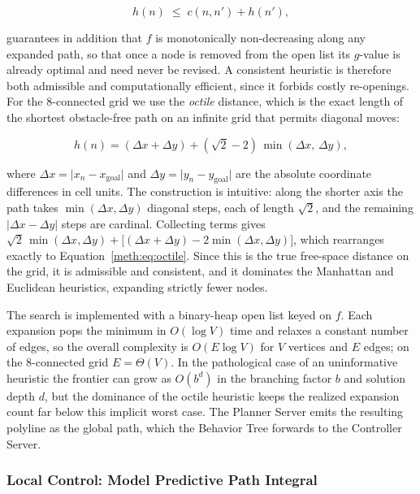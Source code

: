 \begin{equation}\label{meth:eq:consistency}
  h(n) \;\le\; c(n,n') + h(n'),
\end{equation}

guarantees in addition that $f$ is monotonically non-decreasing along any expanded path, so that
once a node is removed from the open list its $g$-value is already optimal and need never be
revised. A consistent heuristic is therefore both admissible and computationally efficient, since
it forbids costly re-openings. For the $8$-connected grid we use the \emph{octile} distance,
which is the exact length of the shortest obstacle-free path on an infinite grid that permits
diagonal moves:

\begin{equation}\label{meth:eq:octile}
  h(n) = (\Delta x + \Delta y) + (\sqrt{2}-2)\,\min(\Delta x,\,\Delta y),
\end{equation}

where $\Delta x = \lvert x_n - x_{\mathrm{goal}}\rvert$ and
$\Delta y = \lvert y_n - y_{\mathrm{goal}}\rvert$ are the absolute coordinate differences in cell
units. The construction is intuitive: along the shorter axis the path takes
$\min(\Delta x,\Delta y)$ diagonal steps, each of length $\sqrt{2}$, and the remaining
$\lvert\Delta x-\Delta y\rvert$ steps are cardinal. Collecting terms gives
$\sqrt{2}\,\min(\Delta x,\Delta y) + \bigl[(\Delta x+\Delta y)-2\min(\Delta x,\Delta y)\bigr]$,
which rearranges exactly to Equation~\eqref{meth:eq:octile}. Since this is the true free-space distance on the
grid, it is admissible and consistent, and it dominates the Manhattan and Euclidean heuristics,
expanding strictly fewer nodes.

The search is implemented with a binary-heap open list keyed on $f$. Each expansion pops the
minimum in $O(\log V)$ time and relaxes a constant number of edges, so the overall complexity is
$O(E\log V)$ for $V$ vertices and $E$ edges; on the $8$-connected grid $E=\Theta(V)$. In the
pathological case of an uninformative heuristic the frontier can grow as $O(b^{d})$ in the
branching factor $b$ and solution depth $d$, but the dominance of the octile heuristic keeps the
realized expansion count far below this implicit worst case. The Planner Server emits the
resulting polyline as the global path, which the Behavior Tree forwards to the Controller Server.

\subsubsection{Local Control: Model Predictive Path Integral}\label{meth:sec:nav-local}

